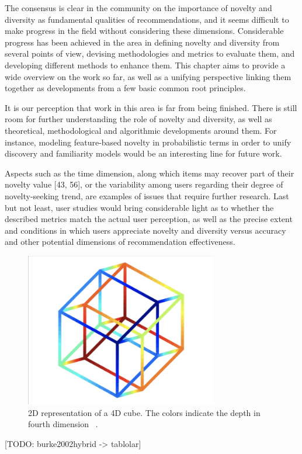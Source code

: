 The consensus is clear in the community on the importance of novelty and diversity as fundamental qualities of recommendations, and it seems difficult to make progress in the field without considering these dimensions. Considerable progress has been achieved in the area in defining novelty and diversity from several points of view, devising methodologies and metrics to evaluate them, and developing different methods to enhance them. This chapter aims to provide a wide overview on the work so far, as well as a unifying perspective linking them together as developments from a few basic common root principles.

It is our perception that work in this area is far from being finished. There is still room for further understanding the role of novelty and diversity, as well as theoretical, methodological and algorithmic developments around them. For instance, modeling feature-based novelty in probabilistic terms in order to unify discovery and familiarity models would be an interesting line for future work.

Aspects such as the time dimension, along which items may recover part of their novelty value [43, 56], or the variability among users regarding their degree of novelty-seeking trend, are examples of issues that require further research. Last but not least, user studies would bring considerable light as to whether the described metrics match the actual user perception, as well as the precise extent and conditions in which users appreciate novelty and diversity versus accuracy and other potential dimensions of recommendation effectiveness.

 \begin{figure}[!ht]
	\centering
	\includegraphics[width=0.75\textwidth]{figures/DimensionalityReduction.png}
	\caption{2D representation of a 4D cube. The colors indicate the depth in fourth dimension ~\parencite{lee2007nonlinear}.}
	\label{fig:embedding-projection-example}
\end{figure}

[TODO: burke2002hybrid -> tablolar]

